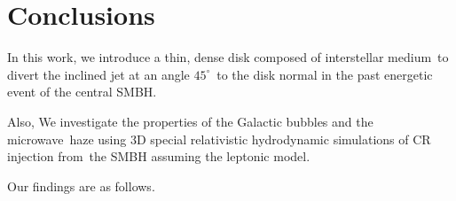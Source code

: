 \documentclass[twocolumn]{aastex631}
\begin{document}
%
%
%
%
%



\section{Conclusions}
\label{Conclusions}


In this work, we introduce a thin, dense disk composed of interstellar medium\
to divert the inclined jet at an angle $45^{\circ}$\
to the disk normal in the past energetic event of the central SMBH.


Also, We investigate the properties of the Galactic bubbles and the microwave\
haze using 3D special relativistic hydrodynamic simulations of CR injection from\
the SMBH assuming the leptonic model.


Our findings are as follows.
\end{document}
